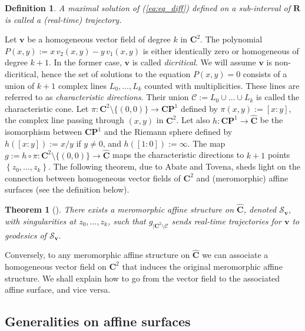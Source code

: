 \documentclass[11pt]{article}
\newtheorem{thm}{Theorem}[section]
\newtheorem*{definition}{Definition}
\begin{document}
\begin{definition}
    A maximal solution of (\ref{eq:eq_diff}) defined on a sub-interval of $\mathbf{R}$ is called a (real-time) trajectory.
\end{definition}

Let $\mathbf{v}$ be a homogeneous vector field of degree $k$ in $\mathbf{C}^{2}$. The polynomial $P\left(x,y\right):=x\,v_{2}\left(x,y\right)-y\,v_{1}\left(x,y\right)$ is either identically zero or homogeneous of degree $k+1$. In the former case, $\mathbf{v}$ is called \textit{dicritical}. We will assume $\mathbf{v}$ is non-dicritical, hence the set of solutions to the equation $P\left(x,y\right)=0$ consists of a union of $k+1$ complex lines $L_{0},\ldots,L_{k}$ counted with multiplicities. These lines are referred to as \textit{characteristic directions}. Their union $\mathcal{C}:=L_{0}\cup\ldots\cup L_{k}$ is called the characteristic cone. Let $\pi:\mathbf{C}^{2}\setminus\{(0,0)\}\rightarrow\mathbf{CP}^{1}$ defined by $\pi(x,y):=[x:y]$, the complex line passing through $(x,y)$ in $\mathbf{C}^{2}$. Let also $h:\mathbf{CP}^{1}\rightarrow\widehat{\mathbf{C}}$ be the isomorphism between $\mathbf{CP}^{1}$ and the Riemann sphere defined by $h([x:y]):=x/y$ if $y\neq0$, and $h([1:0]):=\infty$. The map $g:=h\circ\pi:\mathbf{C}^{2}\setminus\{(0,0)\}\rightarrow\widehat{\mathbf{C}}$ maps the characteristic directions to $k+1$ points $\left\{z_{0},\ldots,z_{k}\right\}$. The following theorem, due to Abate and Tovena, sheds light on the connection between homogeneous vector fields of $\mathbf{C}^{2}$ and (meromorphic) affine surfaces (see the definition below).

\begin{thm}[\cite{AbateTovena}]
\label{thm:AbateTovena}
    There exists a meromorphic affine structure on $\widehat{\mathbf{C}}$, denoted $\mathcal{S}_{\mathbf{v}}$, with singularities at $z_{0},\ldots,z_{k}$, such that $g_{|\mathbf{C}^{2}\setminus\mathcal{C}}$ sends real-time trajectories for $\mathbf{v}$ to geodesics of $\mathcal{S}_{\mathbf{v}}$.
\end{thm}

Conversely, to any meromorphic affine structure on $\widehat{\mathbf{C}}$ we can associate a homogeneous vector field on $\mathbf{C}^{2}$ that induces the original meromorphic affine structure. We shall explain how to go from the vector field to the associated affine surface, and vice versa.

\subsection{Generalities on affine surfaces}
\end{document}
